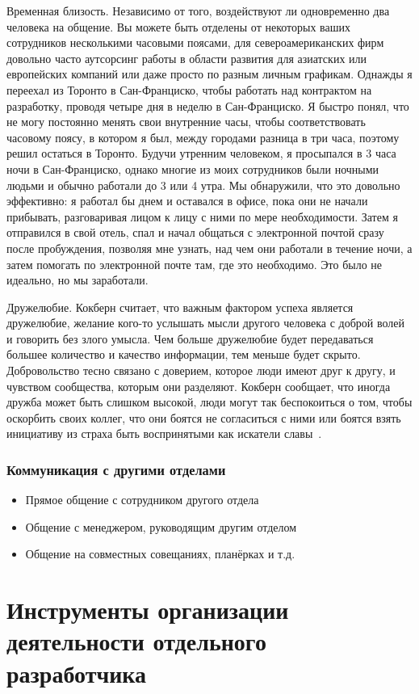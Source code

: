\documentclass{../industrial-development}
\begin{document}
Временная близость. Независимо от того, воздействуют ли одновременно два человека на общение. Вы можете быть отделены от некоторых ваших сотрудников несколькими часовыми поясами, для североамериканских фирм довольно часто аутсорсинг работы в области развития для азиатских или европейских компаний или даже просто по разным личным графикам. Однажды я переехал из Торонто в Сан-Франциско, чтобы работать над контрактом на разработку, проводя четыре дня в неделю в Сан-Франциско. Я быстро понял, что не могу постоянно менять свои внутренние часы, чтобы соответствовать часовому поясу, в котором я был, между городами разница в три часа, поэтому решил остаться в Торонто. Будучи утренним человеком, я просыпался в 3 часа ночи в Сан-Франциско, однако многие из моих сотрудников были ночными людьми и обычно работали до 3 или 4 утра. Мы обнаружили, что это довольно эффективно: я работал бы днем ​​и оставался в офисе, пока они не начали прибывать, разговаривая лицом к лицу с ними по мере необходимости. Затем я отправился в свой отель, спал и начал общаться с электронной почтой сразу после пробуждения, позволяя мне узнать, над чем они работали в течение ночи, а затем помогать по электронной почте там, где это необходимо. Это было не идеально, но мы заработали.

Дружелюбие. Кокберн считает, что важным фактором успеха является дружелюбие, желание кого-то услышать мысли другого человека с доброй волей и говорить без злого умысла. Чем больше дружелюбие будет передаваться большее количество и качество информации, тем меньше будет скрыто. Добровольство тесно связано с доверием, которое люди имеют друг к другу, и чувством сообщества, которым они разделяют. Кокберн сообщает, что иногда дружба может быть слишком высокой, люди могут так беспокоиться о том, чтобы оскорбить своих коллег, что они боятся не согласиться с ними или боятся взять инициативу из страха быть воспринятыми как искатели славы~\cite{AgileComm}.

\begin{frame} \frametitle{Коммуникация с другими отделами}
  \begin{itemize}
  \item Прямое общение с сотрудником другого отдела
  \item Общение с менеджером, руководящим другим отделом
  \item Общение на совместных совещаниях, планёрках и т.д.
  \end{itemize}
\end{frame}

\section{Инструменты организации деятельности отдельного разработчика}
\end{document}
